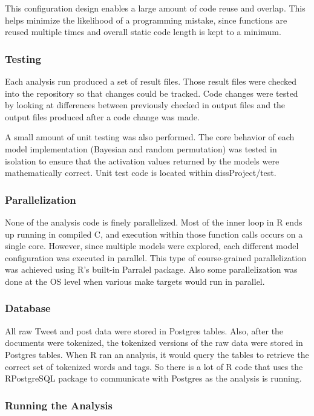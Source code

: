 \documentclass[man,floatsintext,donotrepeattitle]{apa6}
\begin{document}
This configuration design enables a large amount of code reuse and overlap.
This helps minimize the likelihood of a programming mistake, since functions are reused multiple times and overall static code length is kept to a minimum.

\subsubsection{Testing}

Each analysis run produced a set of result files.
Those result files were checked into the repository so that changes could be tracked.
Code changes were tested by looking at differences between previously checked in output files and the output files produced after a code change was made.

A small amount of unit testing was also performed.
The core behavior of each model implementation (Bayesian and random permutation) was tested in isolation to ensure that the activation values returned by the models were mathematically correct.
Unit test code is located within dissProject/test.

\subsubsection{Parallelization}

None of the analysis code is finely parallelized.
Most of the inner loop in R ends up running in compiled C, and execution within those function calls occurs on a single core.
However, since multiple models were explored, each different model configuration was executed in parallel.
This type of course-grained parallelization was achieved using R's built-in Parralel package.
Also some parallelization was done at the OS level when various make targets would run in parallel.

\subsubsection{Database}

All raw Tweet and post data were stored in Postgres tables.
Also, after the documents were tokenized, the tokenized versions of the raw data were stored in Postgres tables.
When R ran an analysis, it would query the tables to retrieve the correct set of tokenized words and tags.
So there is a lot of R code that uses the RPostgreSQL package to communicate with Postgres as the analysis is running.

\subsubsection{Running the Analysis}
\end{document}
